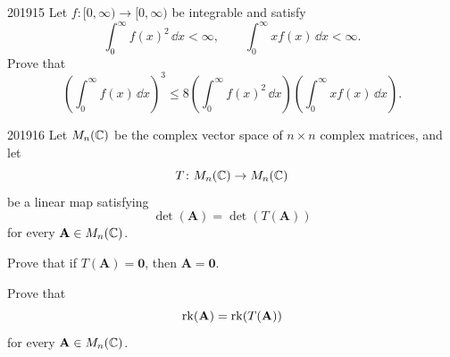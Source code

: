 \begin{problem}{2019}{1}{5}
Let $f\colon[0, \infty)\to[0, \infty)$ be integrable and satisfy
\[
    \int_0^{\infty}f(x)^2\, \dd x<\infty,
    \qquad
    \int_0^{\infty}xf(x)\, \dd x<\infty.
\]
Prove that
\[
    \left(\int_0^{\infty}f(x)\, \dd x\right)^3
    \le
    8\left(\int_0^{\infty}f(x)^2\, \dd x\right)
    \left(\int_0^{\infty}xf(x)\, \dd x\right).
\]
\end{problem}

\begin{problem}{2019}{1}{6}
Let $M_n(\mathbb{C})$ be the complex vector space of $n\times n$ complex matrices, and let
\[
    T\colon M_n(\mathbb{C})\to M_n(\mathbb{C})
\]
be a linear map satisfying
\[
    \det(\mathbf A)=\det(T(\mathbf A))
\]
for every $\mathbf A\in M_n(\mathbb{C})$.
\begin{problemsubparts}
    \item Prove that if $T(\mathbf A)=\mathbf0$, then $\mathbf A=\mathbf0$.
    \item Prove that
    \[
        \operatorname{rk}(\mathbf A)=\operatorname{rk}(T(\mathbf A))
    \]
    for every $\mathbf A\in M_n(\mathbb{C})$.
\end{problemsubparts}
\end{problem}
